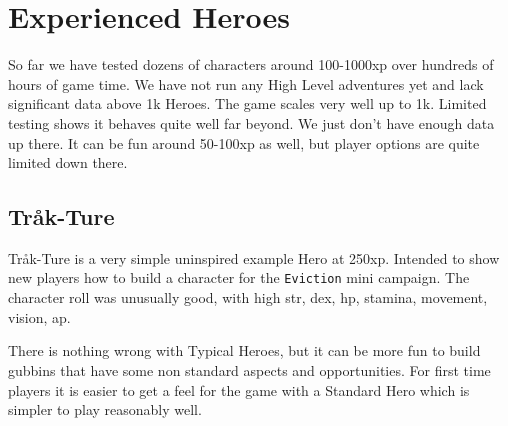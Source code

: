 \clearpage
{}
\section*{Experienced Heroes}
So far we have tested dozens of characters around 100-1000xp over hundreds of hours of game time. We have not run any High Level adventures yet and lack significant data above 1k Heroes.
The game scales very well up to 1k. Limited testing shows it behaves quite well far beyond. We just don't have enough data up there.
It can be fun around 50-100xp as well, but player options are quite limited down there.


\subsection*{Tråk-Ture}
Tråk-Ture is a very simple uninspired example Hero at 250xp. Intended to show new players how to build a character for the \texttt{Eviction} mini campaign. The character roll was unusually good, with high str, dex, hp, stamina, movement, vision, ap.

There is nothing wrong with Typical Heroes, but it can be more fun to build gubbins that have some non standard aspects and opportunities. For first time players it is easier to get a feel for the game with a Standard Hero which is simpler to play reasonably well.

\

